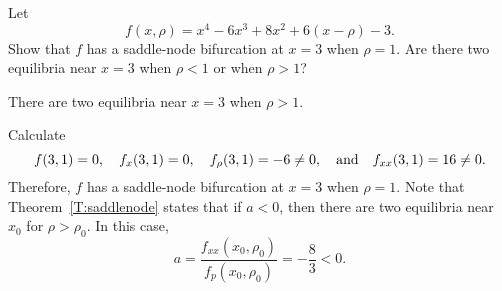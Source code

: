 \documentclass{ximera}
\begin{document}
\begin{exercise} \label{c9.3.2}
Let 
\[
f(x,\rho) = x^4 - 6x^3 +8x^2 + 6(x-\rho) - 3.
\]
Show that $f$ has a saddle-node bifurcation at $x=3$ when $\rho=1$. 
Are there two equilibria near $x=3$ when $\rho<1$ or when $\rho>1$?

\begin{solution}

\ans There are two equilibria near $x = 3$ when $\rho > 1$.

\soln Calculate
\[
f(3,1) = 0, \quad
f_x(3,1) = 0, \quad
f_\rho(3,1) = -6 \neq 0, \quad\mbox{and}\quad
f_{xx}(3,1) = 16 \neq 0.
\]
Therefore, $f$ has a saddle-node bifurcation at $x = 3$ when $\rho =
1$.  Note that Theorem~\ref{T:saddlenode} states
that if $a < 0$, then there are two equilibria near $x_0$ for $\rho >
\rho_0$.  In this case,
\[
a = \frac{f_{xx}(x_0,\rho_0)}{f_p(x_0,\rho_0)} = -\frac{8}{3} < 0.
\]

\end{solution}
\end{exercise}
\end{document}
